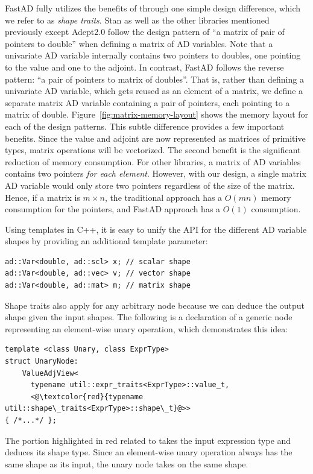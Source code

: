 FastAD fully utilizes the benefits of  through one simple design difference, which we refer to as \emph{shape traits}.
Stan as well as the other libraries mentioned previously except Adept2.0
follow the design pattern of ``a matrix of pair of pointers to double'' when defining a matrix of AD variables.
Note that a univariate AD variable internally contains two pointers to doubles,
one pointing to the value and one to the adjoint.
In contrast, FastAD follows the reverse pattern: ``a pair of pointers to matrix of doubles''.
That is, rather than defining a univariate AD variable, which gets reused as an element of a matrix,
we define a separate matrix AD variable containing a pair of pointers, each pointing to a matrix of double.
Figure~\ref{fig:matrix-memory-layout} shows the memory layout for each of the design patterns.
This subtle difference provides a few important benefits.
Since the value and adjoint are now represented as matrices of primitive types,
matrix operations will be vectorized.
The second benefit is the significant reduction of memory consumption.
For other libraries, a matrix of AD variables contains two pointers \emph{for each element}.
However, with our design, a single matrix AD variable would only store two pointers
regardless of the size of the matrix.
Hence, if a matrix is $m\times n$, 
the traditional approach has a $O(mn)$ memory consumption for the pointers,
and FastAD approach has a $O(1)$ consumption.

Using templates in C++,
it is easy to unify the API for the different AD variable shapes
by providing an additional template parameter:
\begin{lstlisting}[style=customcpp]
ad::Var<double, ad::scl> x; // scalar shape
ad::Var<double, ad::vec> v; // vector shape
ad::Var<double, ad::mat> m; // matrix shape
\end{lstlisting}

Shape traits also apply for any arbitrary node because
we can deduce the output shape given the input shapes.
The following is a declaration of a generic node representing an
element-wise unary operation, which demonstrates this idea:
\begin{lstlisting}[style=customcpp]
template <class Unary, class ExprType>
struct UnaryNode:
    ValueAdjView<
      typename util::expr_traits<ExprType>::value_t,
      <@\textcolor{red}{typename util::shape\_traits<ExprType>::shape\_t}@>>
{ /*...*/ };
\end{lstlisting}
The portion highlighted in red related to 
takes the input expression type  and deduces its shape type.
Since an element-wise unary operation always has the same shape as its input,
the unary node takes on the same shape.

